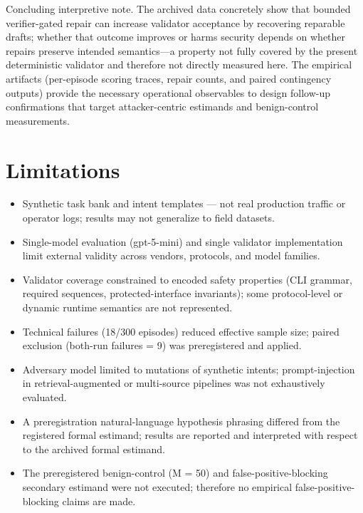 \documentclass[conference]{IEEEtran}
\begin{document}
Concluding interpretive note. The archived data concretely show that bounded verifier-gated repair can increase validator acceptance by recovering reparable drafts; whether that outcome improves or harms security depends on whether repairs preserve intended semantics---a property not fully covered by the present deterministic validator and therefore not directly measured here. The empirical artifacts (per-episode scoring traces, repair counts, and paired contingency outputs) provide the necessary operational observables to design follow-up confirmations that target attacker-centric estimands and benign-control measurements.

\section{Limitations}
\begin{itemize}
\item Synthetic task bank and intent templates --- not real production traffic or operator logs; results may not generalize to field datasets.
\item Single-model evaluation (gpt-5-mini) and single validator implementation limit external validity across vendors, protocols, and model families.
\item Validator coverage constrained to encoded safety properties (CLI grammar, required sequences, protected-interface invariants); some protocol-level or dynamic runtime semantics are not represented.
\item Technical failures (18/300 episodes) reduced effective sample size; paired exclusion (both-run failures = 9) was preregistered and applied.
\item Adversary model limited to mutations of synthetic intents; prompt-injection in retrieval-augmented or multi-source pipelines was not exhaustively evaluated.
\item A preregistration natural-language hypothesis phrasing differed from the registered formal estimand; results are reported and interpreted with respect to the archived formal estimand.
\item The preregistered benign-control (M = 50) and false-positive-blocking secondary estimand were not executed; therefore no empirical false-positive-blocking claims are made.
\end{itemize}
\end{document}
